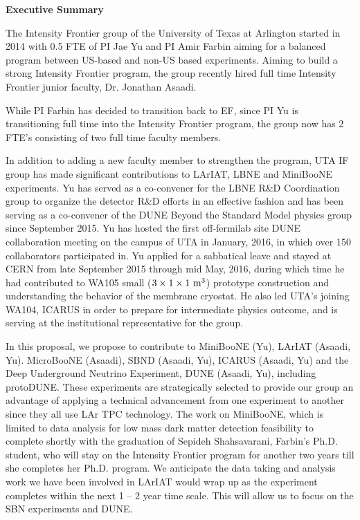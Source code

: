 

\textbf{Executive Summary}

The Intensity Frontier group of the University of Texas at Arlington started in 2014 with 0.5 FTE of PI Jae Yu and PI Amir Farbin aiming for a balanced program between US-based and non-US based experiments. Aiming to build a strong Intensity Frontier program, the group recently hired full time Intensity Frontier junior faculty, Dr. Jonathan Asaadi.

While PI Farbin has decided to transition back to EF, since PI Yu is transitioning full time into the Intensity Frontier program, 
the group now has 2 FTE’s consisting of two full time faculty members.

In addition to adding a new faculty member to strengthen the program, UTA IF group has made significant contributions to LArIAT, LBNE and MiniBooNE experiments.  
Yu has served as a co-convener for the LBNE R\&D Coordination group to organize the detector R\&D efforts in an effective fashion and has been serving as a co-convener of the DUNE Beyond the Standard Model physics group since September 2015. 
Yu has hosted the first off-fermilab site DUNE collaboration meeting on the campus of UTA in January, 2016, in which over 150 collaborators participated in.
Yu applied for a sabbatical leave and stayed at CERN from late September 2015 through mid May, 2016, 
during which time he had contributed to WA105 small ($3\times 1 \times 1~{\rm m^{3}}$) prototype construction and understanding the behavior of
the membrane cryostat.
He also led UTA’s joining WA104, ICARUS in order to prepare for intermediate physics outcome, and is serving at the institutional representative for the group.

In this proposal, we propose to contribute to MiniBooNE (Yu), LArIAT (Asaadi, Yu). MicroBooNE (Asaadi), SBND (Asaadi, Yu), ICARUS (Asaadi, Yu) and the Deep Underground Neutrino Experiment, DUNE (Asaadi, Yu), including protoDUNE.  
These experiments are strategically selected to provide our group an advantage of applying a technical advancement from one experiment to another since they all use LAr TPC technology.  
The work on MiniBooNE, which is limited to data analysis for low mass dark matter detection feasibility to complete shortly with the graduation of Sepideh Shahsavarani, Farbin’s Ph.D. student, who will stay on the Intensity Frontier program for another two years till she completes her Ph.D. program.
We anticipate the data taking and analysis work we have been involved in LArIAT would wrap up as the experiment completes within 
the next 1 – 2 year time scale.  
This will allow us to focus on the SBN experiments and DUNE.

